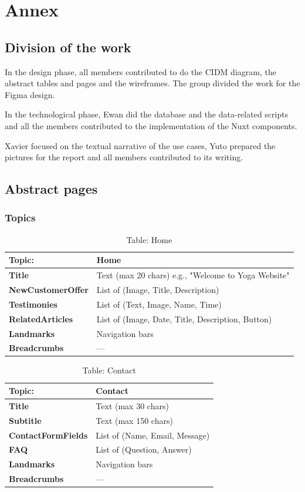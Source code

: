 \newpage
\section{Annex}

\subsection{Division of the work}

In the design phase, all members contributed to do the CIDM diagram, the abstract tables and pages and the wireframes. The group divided the work for the Figma design.

In the technological phase, Ewan did the database and the data-related scripts and all the members contributed to the implementation of the Nuxt components.

Xavier focused on the textual narrative of the use cases, Yuto prepared the pictures for the report and all members contributed to its writing.

\subsection{Abstract pages}

\subsubsection{Topics}

\begin{table}[H]
\centering
\begin{tabularx}{\textwidth}{|>{\bfseries}l|X|}
\hline
Topic: & \textbf{Home} \\
\hline
Title & Text (max 20 chars) e.g., "Welcome to Yoga Website" \\
\hline
NewCustomerOffer & List of (Image, Title, Description) \\
\hline
Testimonies & List of (Text, Image, Name, Time) \\
\hline
RelatedArticles & List of (Image, Date, Title, Description, Button) \\
\hline
Landmarks & Navigation bars \\
\hline
Breadcrumbs & — \\
\hline
\end{tabularx}
\caption{Table: Home}
\end{table}

\begin{table}[H]
\centering
\begin{tabularx}{\textwidth}{|>{\bfseries}l|X|}
\hline
Topic: & \textbf{Contact} \\
\hline
Title & Text (max 30 chars) \\
\hline
Subtitle & Text (max 150 chars) \\
\hline
ContactFormFields & List of (Name, Email, Message) \\
\hline
FAQ & List of (Question, Answer) \\
\hline
Landmarks & Navigation bars \\
\hline
Breadcrumbs & — \\
\hline
\end{tabularx}
\caption{Table: Contact}
\end{table}

